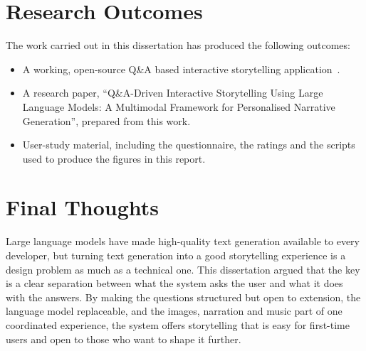 \section{Research Outcomes}

The work carried out in this dissertation has produced the following outcomes:

\begin{itemize}
    \item A working, open-source Q\&A based interactive storytelling application~\citep{jha2026repo}.
    \item A research paper, ``Q\&A-Driven Interactive Storytelling Using Large Language Models: A Multimodal Framework for Personalised Narrative Generation'', prepared from this work.
    \item User-study material, including the questionnaire, the ratings and the scripts used to produce the figures in this report.
\end{itemize}

\section{Final Thoughts}

Large language models have made high-quality text generation available to every developer, but turning text generation into a good storytelling experience is a design problem as much as a technical one. This dissertation argued that the key is a clear separation between what the system asks the user and what it does with the answers. By making the questions structured but open to extension, the language model replaceable, and the images, narration and music part of one coordinated experience, the system offers storytelling that is easy for first-time users and open to those who want to shape it further.
